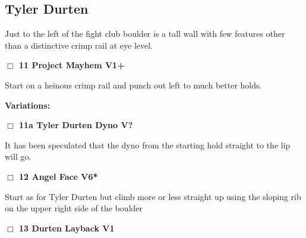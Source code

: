 \begin{multicols}{2}
\needspace{10em}
\subsection*{Tyler Durten}\label{bf:Tyler Durten}

Just to the left of the fight club boulder is a tall wall with few features other than a distinctive crimp rail at eye level.\\



\needspace{2em}
\label{rt:Project Mayhem}
\colorbox{green!20}{
\parbox{0.95\linewidth}{
\hspace{-1ex}\textbf{$\Box$
11 Project Mayhem V1+  
}}}
\begin{adjustwidth}{1.3em}{}			

Start on a heinous crimp rail and punch out left to much better holds.
\end{adjustwidth}


\begin{adjustwidth}{0.5cm}{}				
\needspace{4em}
\textbf{Variations:} \newline

\needspace{2em}
\label{vr:Tyler Durten Dyno}
\colorbox{black!20}{
\parbox{0.95\linewidth}{
\hspace{-1ex}\textbf{$\Box$
11a Tyler Durten Dyno V?  
}}}
\begin{adjustwidth}{1.3em}{}			

It has been speculated that the dyno from the starting hold straight to the lip will go.
\end{adjustwidth}



\end{adjustwidth}


\needspace{2em}
\label{rt:Angel Face}
\colorbox{RoyalBlue!20}{
\parbox{0.95\linewidth}{
\hspace{-1ex}\textbf{$\Box$
12 Angel Face V6*  
}}}
\begin{adjustwidth}{1.3em}{}			

Start as for Tyler Durten but climb more or less straight up using the sloping rib on the upper right side of the boulder
\end{adjustwidth}




\needspace{2em}
\label{rt:Durten Layback}
\colorbox{green!20}{
\parbox{0.95\linewidth}{
\hspace{-1ex}\textbf{$\Box$
13 Durten Layback V1  
}}}
\begin{adjustwidth}{1.3em}{}			


\end{adjustwidth}
\end{multicols}

